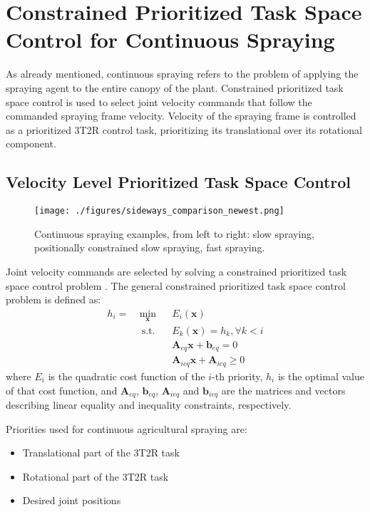 \section{Constrained Prioritized Task Space Control for Continuous Spraying}
\label{sec:cont_spr}

As already mentioned, continuous spraying refers to the problem of applying the spraying agent to the entire canopy of the plant. Constrained prioritized task space control is used to select joint velocity commands that follow the commanded spraying frame velocity. Velocity of the spraying frame is controlled as a prioritized 3T2R control task, prioritizing its translational over its rotational component.  

\subsection{Velocity Level Prioritized Task Space Control}

\begin{figure*}[!t]
\centering
\texttt{[image: ./figures/sideways\_comparison\_newest.png]}
\caption{ Continuous spraying examples, from left to right: slow spraying, positionally constrained slow spraying, fast spraying. 
}
\label{fig:sideways_fig}
\end{figure*}

Joint velocity commands are selected by solving a constrained prioritized task space control problem \cite{deLasa2010}. The general constrained prioritized task space control problem is defined as:
\begin{equation}
	\begin{aligned}
		h_i = & \ \underset{\boldsymbol{x}}{\text{min}} & & E_i(\boldsymbol{x})\\
		& \ \ \text{s.t.} & & E_k(\boldsymbol{x}) = h_k, \forall k < i\\
		& & & \boldsymbol{A}_{eq}\boldsymbol{x} + \boldsymbol{b}_{eq} = 0\\
		& & & \boldsymbol{A}_{ieq}\boldsymbol{x} + \boldsymbol{A}_{ieq} \geq 0
	\end{aligned}
\end{equation}
where $E_i$ is the quadratic cost function of the $i$-th priority, $h_i$ is the optimal value of that cost function, and $\boldsymbol{A}_{eq}$, $\boldsymbol{b}_{eq}$, $\boldsymbol{A}_{ieq}$ and $\boldsymbol{b}_{ieq}$ are the matrices and vectors describing linear equality and inequality constraints, respectively.

Priorities used for continuous agricultural spraying are:
\begin{itemize}
    \item Translational part of the 3T2R task
    \item Rotational part of the 3T2R task
    \item Desired joint positions
\end{itemize}

